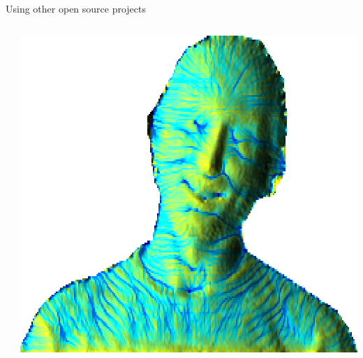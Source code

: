\documentclass[xcolor={dvipsnames,usenames},beamer,aspectratio=43]{beamer}
\begin{document}
\begin{frame}{Using other open source projects}
\begin{columns}
\begin{column}{0.5\textwidth}
\begin{columns}
\begin{column}{0.2\textwidth}
\end{column}
\end{columns}

\end{column}
\begin{column}{0.45\textwidth}

\begin{center}
  \includegraphics[width=\textwidth]{tangible/face}
\end{center}

\end{column}
\end{columns}

\end{frame}
\end{document}
